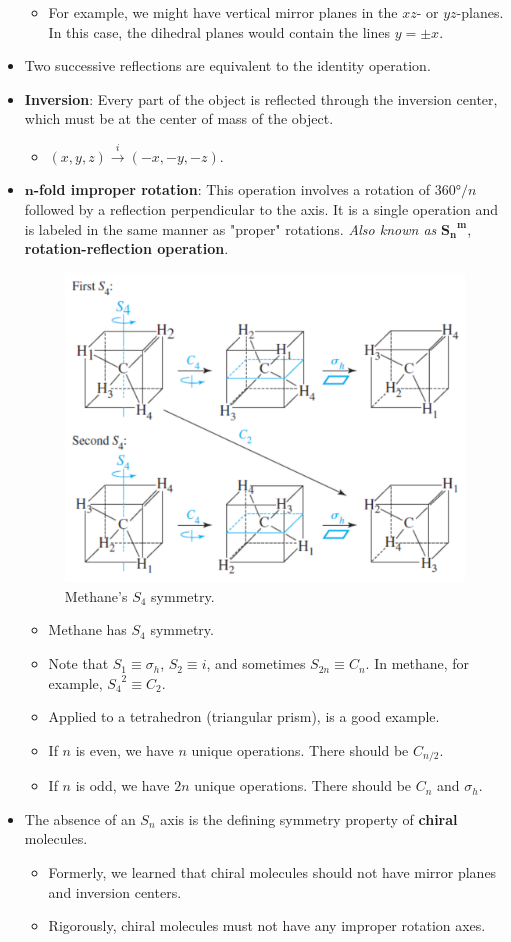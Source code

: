 \documentclass[../notes.tex]{subfiles}
\begin{document}
\begin{itemize}
    \begin{itemize}
        \item For example, we might have vertical mirror planes in the $xz$- or $yz$-planes. In this case, the dihedral planes would contain the lines $y=\pm x$.
    \end{itemize}
    \item Two successive reflections are equivalent to the identity operation.
    \item \textbf{Inversion}: Every part of the object is reflected through the inversion center, which must be at the center of mass of the object.
    \begin{itemize}
        \item $(x,y,z)\xrightarrow{i}(-x,-y,-z)$.
    \end{itemize}
    \item \textbf{$\bm{n}$-fold improper rotation}: This operation involves a rotation of $\ang{360}/n$ followed by a reflection perpendicular to the axis. It is a single operation and is labeled in the same manner as "proper" rotations. \emph{Also known as} $\bm{{S_n}^m}$, \textbf{rotation-reflection operation}.
    \begin{figure}[h!]
        \centering
        \includegraphics[width=0.4\linewidth]{../ExtFiles/methaneImproperRotation.png}
        \caption{Methane's $S_4$ symmetry.}
        \label{fig:methaneImproperRotation}
    \end{figure}
    \begin{itemize}
        \item Methane has $S_4$ symmetry.
        \item Note that $S_1\equiv\sigma_h$, $S_2\equiv i$, and sometimes $S_{2n}\equiv C_n$. In methane, for example, ${S_4}^2\equiv C_2$.
        \item Applied to a tetrahedron (triangular prism), is a good example.
        \item If $n$ is even, we have $n$ unique operations. There should be $C_{n/2}$.
        \item If $n$ is odd, we have $2n$ unique operations. There should be $C_n$ and $\sigma_h$.
    \end{itemize}
    \item The absence of an $S_n$ axis is the defining symmetry property of \textbf{chiral} molecules.
    \begin{itemize}
        \item Formerly, we learned that chiral molecules should not have mirror planes and inversion centers.
        \item Rigorously, chiral molecules must not have any improper rotation axes.
    \end{itemize}
\end{itemize}
\end{document}
